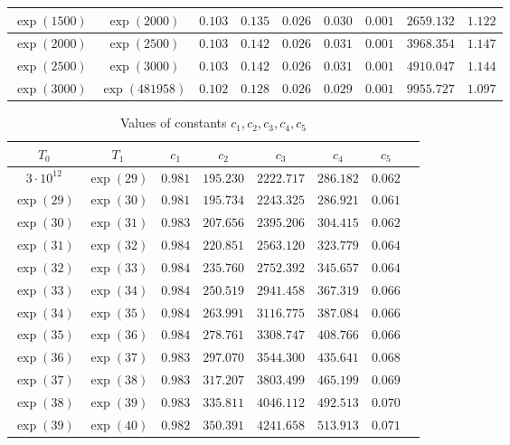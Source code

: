 \documentclass[reqno]{amsart}
\numberwithin{equation}{section}
\theoremstyle{remark}
\begin{document}
\begin{table}[h]
\begin{tabular}{|c|c|c|c|c|c|c|c|c|}
\hline
$\exp(1500)$ & $\exp(2000)$ & $0.103$ & $0.135$ & $0.026$ & $0.030$ & $0.001$ & $2659.132$ & $1.122$\\
\hline
$\exp(2000)$ & $\exp(2500)$ & $0.103$ & $0.142$ & $0.026$ & $0.031$ & $0.001$ & $3968.354$ & $1.147$\\
\hline
$\exp(2500)$ & $\exp(3000)$ & $0.103$ & $0.142$ & $0.026$ & $0.031$ & $0.001$ & $4910.047$ & $1.144$\\
\hline
$\exp(3000)$ & $\exp(481958)$ & $0.102$ & $0.128$ &  $0.026 $ & $0.029$ & $ 0.001$ & $9955.727$ & $1.097$\\
\hline
\end{tabular}
\label{dconstants}
\end{table}
\begin{table}[h]
\def\arraystretch{1.3}
\centering
\caption{Values of constants $c_1,c_2,c_3,c_4,c_5$ }
\begin{tabular}{|c|c|c|c|c|c|c|c|}
\hline
$T_0$ & $T_1$ & $c_1$ & $c_2$ & $c_3$ & $c_4$ & $c_5$  \\
\hline
$3\cdot 10^{12} $ & $\exp(29)$ &  $0.981$ & $195.230$ & $2222.717$ & $286.182$ & $0.062$ \\
\hline
$\exp(29)$ & $\exp(30)$ &  $0.981$& $195.734$ & $2243.325$ & $286.921$ & $0.061$\\
\hline
$\exp(30)$ & $\exp(31)$ &  $0.983$& $207.656$ & $2395.206$ & $304.415$ & $0.062$\\
\hline
$\exp(31)$ & $\exp(32)$ &  $0.984$& $220.851$ & $2563.120$ & $323.779$ & $0.064$\\
\hline
$\exp(32)$ & $\exp(33)$ &  $0.984$& $235.760$ & $2752.392$ & $345.657$ & $0.064$\\
\hline
$\exp(33)$ & $\exp(34)$ &  $0.984$& $250.519$ & $2941.458$ & $367.319$ & $0.066$\\
\hline
$\exp(34)$ & $\exp(35)$ &  $0.984$& $ 263.991$ & $3116.775$ & $387.084$ & $0.066$\\
\hline
$\exp(35)$ & $\exp(36)$ &  $0.984$& $278.761$ & $3308.747$ & $408.766$ & $0.066$\\
\hline
$\exp(36)$ & $\exp(37)$ &  $0.983$& $297.070$ & $3544.300$ & $435.641$ & $0.068$\\
\hline
$\exp(37)$ & $\exp(38)$ &  $0.983$& $317.207$ & $3803.499$ & $465.199$ & $0.069$\\
\hline
$\exp(38)$ & $\exp(39)$ &  $0.983$& $335.811$ & $4046.112$ & $492.513$ & $0.070$\\
\hline
$\exp(39)$ & $\exp(40)$ &  $0.982$& $350.391$ & $4241.658$ & $513.913$ & $0.071$\\

\end{tabular}
\end{table}
\end{document}
